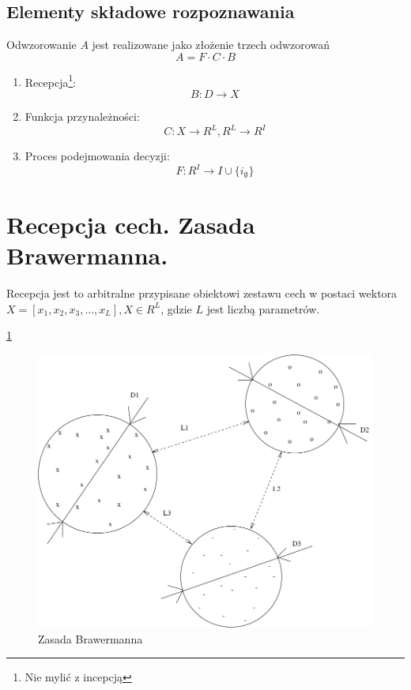 \documentclass[a4paper,10pt]{article}
\begin{document}
\subsection{Elementy składowe rozpoznawania}
Odwzorowanie $A$ jest realizowane jako złożenie trzech odwzorowań
\begin{equation}
 A = F \cdot C \cdot B
\end{equation}
\begin{enumerate}
 \item Recepcja\footnote{Nie mylić z incepcją}:
    \begin{equation}
      B: D \rightarrow X
    \end{equation}
 \item Funkcja przynależności:
    \begin{equation}
      C: X \rightarrow R^L, R^L \rightarrow R^I
    \end{equation}
  \item Proces podejmowania decyzji:
    \begin{equation}
      F: R^I \rightarrow I \cup \{i_{\emptyset}\}
    \end{equation}
\end{enumerate}

\section{Recepcja cech. Zasada Brawermanna.}
Recepcja jest to arbitralne przypisane obiektowi zestawu cech w postaci wektora $X = [x_1, x_2, x_3, \ldots, x_L], X \in R^L$, gdzie $L$ jest liczbą parametrów.

\ref{fig:brawermann}
\begin{figure}[h]
  \centering
  \includegraphics[width=\textwidth]{brawermann.pdf}
  \caption{Zasada Brawermanna}
  \label{fig:brawermann}
\end{figure}
\end{document}

